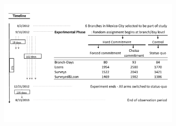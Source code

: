 \documentclass[oneside,11pt]{article}
\begin{document}
\begin{figure}[H]
\end{figure}




\begin{figure}[H]
     \caption{Experiment description}
    \label{exp_description}
\begin{center}
\begin{subfigure}{\textwidth}
        \includegraphics[width=\textwidth]{Figuras/consort.pdf}
    \end{subfigure}
  \end{center}
    \scriptsize 
    
\end{figure}
\end{document}
